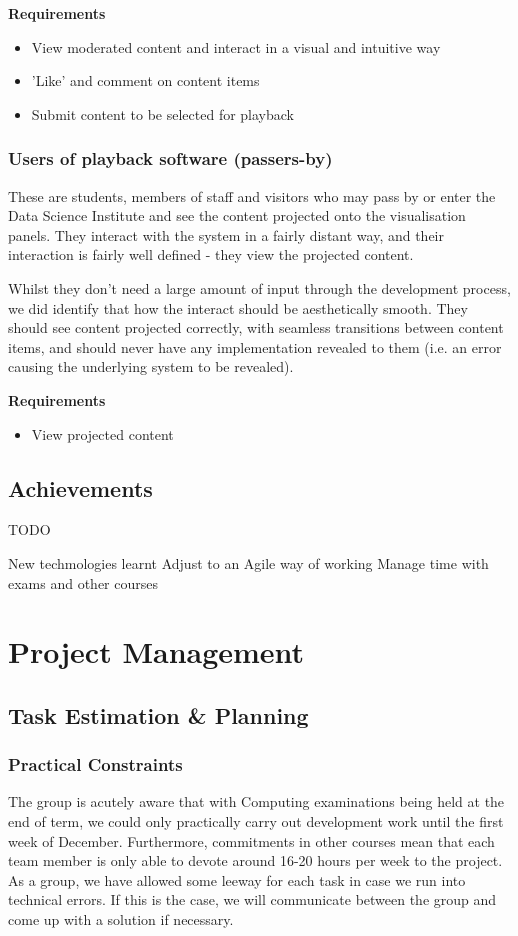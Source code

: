 \documentclass[a4paper, titlepage]{article}
\begin{document}
\textbf{Requirements}
\begin{itemize}
\item View moderated content and interact in a visual and intuitive way
\item 'Like' and comment on content items
\item Submit content to be selected for playback
\end{itemize}

\subsubsection{Users of playback software (passers-by)}

These are students, members of staff and visitors who may pass by or enter the Data Science Institute and see the content projected onto the visualisation panels. They interact with the system in a fairly distant way, and their interaction is fairly well defined - they view the projected content.

Whilst they don't need a large amount of input through the development process, we did identify that how the interact should be aesthetically smooth. They should see content projected correctly, with seamless transitions between content items, and should never have any implementation revealed to them (i.e. an error causing the underlying system to be revealed).

\textbf{Requirements}
\begin{itemize}
\item View projected content
\end{itemize}


\subsection{Achievements}
TODO

New techmologies learnt
Adjust to an Agile way of working
Manage time with exams and other courses


\newpage
\section{Project Management}

\subsection{Task Estimation \& Planning}

\subsubsection{Practical Constraints}
The group is acutely aware that with Computing examinations being held at the
end of term, we could only practically carry out development work until the
first week of December. Furthermore, commitments in other courses mean that 
each team member is only able to devote around 16-20 hours per week to
the project. As a group, we have allowed some leeway for each task in case we run into technical errors. If this is the case, we will communicate between the group and come up with a solution if necessary.
\end{document}
